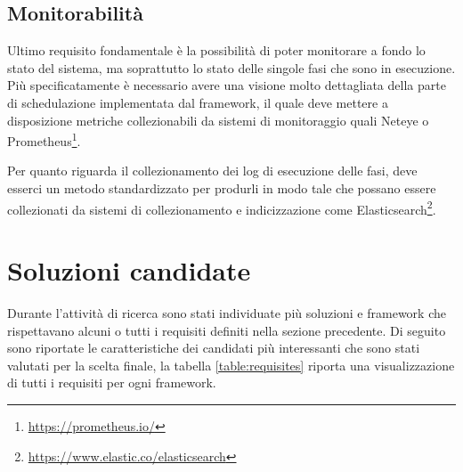 \subsection{Monitorabilità}
\label{sub:monitorable}

Ultimo requisito fondamentale è la possibilità di poter monitorare a fondo lo
stato del sistema, ma soprattutto lo stato delle singole fasi che sono in esecuzione.
Più specificatamente è necessario avere una visione molto dettagliata della
parte di schedulazione implementata dal framework, il quale deve mettere a disposizione
metriche collezionabili da sistemi di monitoraggio quali Neteye\cite{neteye} o
Prometheus\footnote{\url{https://prometheus.io/}}.

Per quanto riguarda il collezionamento dei log di esecuzione delle fasi, deve
esserci un metodo standardizzato per produrli in modo tale che possano essere
collezionati da sistemi di collezionamento e indicizzazione come Elasticsearch\footnote{\url{https://www.elastic.co/elasticsearch}}.

\section{Soluzioni candidate}
\label{sec:candidates}

Durante l'attività di ricerca sono stati individuate più soluzioni e framework
che rispettavano alcuni o tutti i requisiti definiti nella sezione precedente. Di
seguito sono riportate le caratteristiche dei candidati più interessanti che sono
stati valutati per la scelta finale, la tabella \ref{table:requisites} riporta
una visualizzazione di tutti i requisiti per ogni framework.

